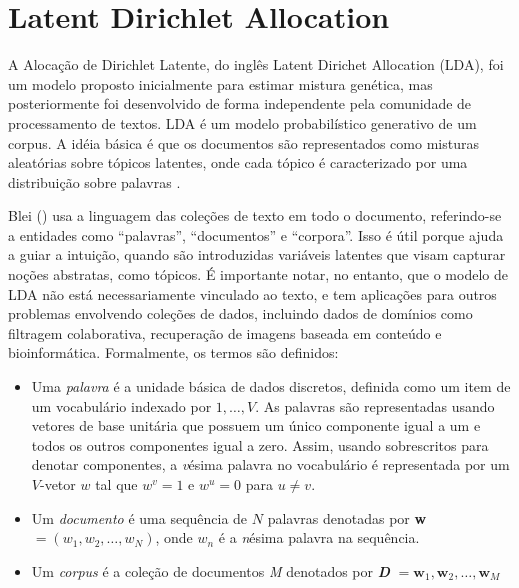 \section{Latent Dirichlet Allocation}

A Alocação de Dirichlet Latente, do inglês Latent Dirichet Allocation (LDA), foi um modelo proposto inicialmente para estimar mistura genética, mas posteriormente foi desenvolvido de forma independente pela comunidade de processamento de textos. 
LDA é um modelo probabilístico generativo de um corpus. A idéia básica é que os documentos são representados como misturas aleatórias sobre tópicos latentes, onde cada tópico é caracterizado por uma distribuição sobre palavras \cite{blei2003}.

Blei (\citeyear{blei2003}) usa a linguagem das coleções de texto em todo o documento, referindo-se a entidades como “palavras”, “documentos” e “corpora”. Isso é útil porque ajuda a guiar a intuição, quando são introduzidas variáveis latentes que visam capturar noções abstratas, como tópicos.
É importante notar, no entanto, que o modelo de LDA não está necessariamente vinculado ao texto, e tem aplicações para outros problemas envolvendo coleções de dados, incluindo dados de domínios como filtragem colaborativa, recuperação de imagens baseada em conteúdo e bioinformática. Formalmente, os termos são definidos:

\begin{itemize}
	\item Uma \textit{palavra} é a unidade básica de dados discretos, definida como um item de um vocabulário indexado por ${1,\dots, V}$. As palavras são representadas usando vetores de base unitária que possuem um único componente igual a um  e todos os outros componentes igual a zero. Assim, usando sobrescritos para denotar componentes, a \textit{v}ésima palavra no vocabulário é representada por um $V$-vetor $w$ tal que $w^v = 1$ e $w^u = 0$ para $u \neq v$.
	\item Um \textit{documento} é uma sequência de $N$ palavras denotadas por \textbf{w} $=(w_1,w_2,\dots,w_N)$, onde $w_n$ é a \textit{n}ésima palavra na sequência.
	\item Um \textit{corpus} é a coleção de documentos \textit{M} denotados por \textbf{\textit{D}} $={\textbf{w}_1, \textbf{w}_2, \dots, \textbf{w}_M}$
\end{itemize}



